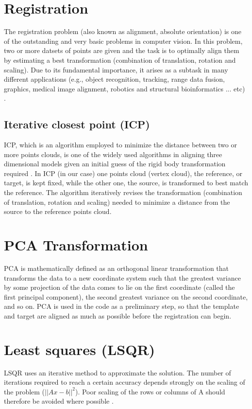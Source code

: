 \documentclass[../structure.tex]{subfiles}
\begin{document}
\section{Registration}
	The registration problem (also known as alignment, absolute orientation) is one of the outstanding and very basic problems in computer vision. In this problem, two or more datsets of points are given and the task is to optimally align them by estimating a best transformation (combination of translation, rotation and scaling). Due to its fundamental importance, it arises as a subtask in many different applications (e.g., object recognition, tracking, range data fusion, graphics, medical image alignment, robotics and structural bioinformatics ... etc) \cite{Li2007}.
		\subsection{Iterative closest point (ICP)}
		 ICP, which is an algorithm employed to minimize the distance between two or more points clouds, is one of the widely used algorithms in aligning three dimensional models given an initial guess of the rigid body transformation required \cite{Zhang1994}.
		 In ICP (in our case) one points cloud (vertex cloud), the reference, or target, is kept fixed, while the other one, the source, is transformed to best match the reference. The algorithm iteratively revises the transformation (combination of translation, rotation and scaling) needed to minimize a distance from the source to the reference points cloud.
\section{PCA Transformation}
PCA is mathematically defined as an orthogonal linear transformation that transforms the data to a new coordinate system such that the greatest variance by some projection of the data comes to lie on the first coordinate (called the first principal component), the second greatest variance on the second coordinate, and so on\cite{Jolliffe2002}.
PCA is used in the code as a preliminary step, so that the template and target are aligned as much as possible before the registration can begin.
\section{Least squares (LSQR)}
LSQR uses an iterative method to approximate the solution. The number of iterations required to reach a certain accuracy depends strongly on the scaling of the problem ($ ||Ax-b||^2 $). Poor scaling of the rows or columns of A should therefore be avoided where possible \cite{Paige1982}.
\end{document}
